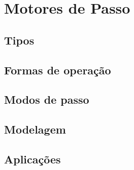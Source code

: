 \section{Motores de Passo}



\subsection{Tipos}



\subsection{Formas de operação}



\subsection{Modos de passo}



\subsection{Modelagem}



\subsection{Aplicações}



